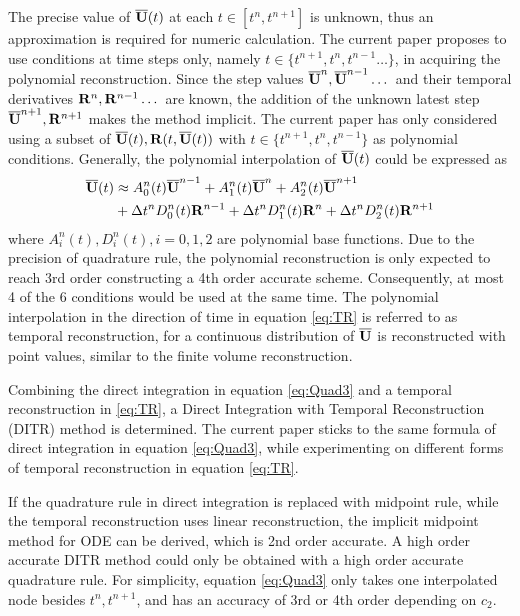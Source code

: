 \documentclass[preprint,12pt]{elsarticle}
\begin{document}
The precise value of $\overline{\mathbf{U}}(t)$ at each $t\in[t^n, t^{n+1}]$
is unknown, thus an approximation is required for numeric calculation.
The current paper proposes to use conditions at
time steps only, namely $t \in \{t^{n+1}, t^n, t^{n-1}\dots\}$,
in acquiring the polynomial reconstruction.
Since the step values $\overline{\mathbf{U}}^n, \overline{\mathbf{U}}^{n-1}\dots$ and
their temporal derivatives $\mathbf{R}^n, \mathbf{R}^{n-1}\dots$ are known,
the addition of the unknown latest step $\overline{\mathbf{U}}^{n+1}, \mathbf{R}^{n+1}$
makes the method implicit.
The current paper has only considered using a subset of
$\overline{\mathbf{U}}(t), \mathbf{R}(t, \overline{\mathbf{U}}(t))$ with $t \in \{t^{n+1}, t^n, t^{n-1}\}$
as polynomial conditions.
Generally, the polynomial interpolation
of $\overline{\mathbf{U}}(t)$ could be expressed as
\begin{equation}
    \begin{aligned}
        \label{eq:TR}
        \overline{\mathbf{U}}(t) & \approx
        A^n_0(t)\overline{\mathbf{U}}^{n - 1} +
        A^n_1(t)\overline{\mathbf{U}}^{n} +
        A^n_2(t)\overline{\mathbf{U}}^{n + 1}
        \\ & +
        \mathrm\Delta t^n D^n_0(t)\mathbf{R}^{n - 1} +
        \mathrm\Delta t^n D^n_1(t)\mathbf{R}^{n} +
        \mathrm\Delta t^n D^n_2(t)\mathbf{R}^{n + 1}
    \end{aligned}
\end{equation}
where $A^n_i(t), D^n_i(t), i=0,1,2$
are polynomial base functions. Due to the precision of quadrature rule,
the polynomial reconstruction is only expected to reach 3rd order
constructing a 4th order accurate scheme. Consequently, at most 4 of the
6 conditions would be used at the same time.
The polynomial interpolation in the direction of time in equation \eqref{eq:TR}
is referred to as temporal reconstruction, for
a continuous distribution of $\overline{\mathbf{U}}$ is reconstructed with point values,
similar to the finite volume reconstruction.

Combining the direct integration in equation \eqref{eq:Quad3}
and a  temporal reconstruction in \eqref{eq:TR},
a Direct Integration with Temporal Reconstruction (DITR) method is
determined.
The current paper sticks to the same formula of direct integration
in equation \eqref{eq:Quad3}, while experimenting on different
forms of temporal reconstruction in equation \eqref{eq:TR}.

If the quadrature rule in direct integration is replaced with
midpoint rule, while the temporal reconstruction uses linear
reconstruction, the implicit midpoint method for ODE can be derived,
which is 2nd order accurate. A high order accurate DITR method could
only be obtained with a high order accurate quadrature rule.
For simplicity, equation \eqref{eq:Quad3} only takes one interpolated
node besides $t^n, t^{n+1}$, and has an accuracy of 3rd or 4th order
depending on $c_2$.
\end{document}
